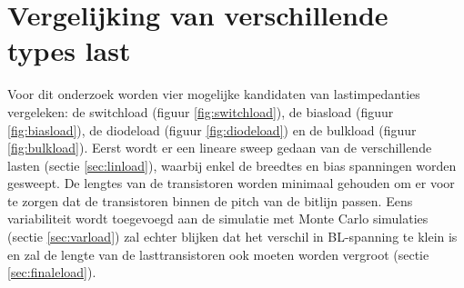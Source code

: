 \section{Vergelijking van verschillende types last}
Voor dit onderzoek worden vier mogelijke kandidaten van lastimpedanties vergeleken: de switchload (figuur \ref{fig:switchload}), de biasload (figuur \ref{fig:biasload}), de diodeload (figuur \ref{fig:diodeload}) en de bulkload (figuur \ref{fig:bulkload})\cite{bulkload}. Eerst wordt er een lineare sweep gedaan van de verschillende lasten (sectie \ref{sec:linload}), waarbij enkel de breedtes en bias spanningen worden gesweept. De lengtes van de transistoren worden minimaal gehouden om er voor te zorgen dat de transistoren binnen de pitch van de bitlijn passen. Eens variabiliteit wordt toegevoegd aan de simulatie met Monte Carlo simulaties (sectie \ref{sec:varload}) zal echter blijken dat het verschil in BL-spanning te klein is en zal de lengte van de lasttransistoren ook moeten worden vergroot (sectie \ref{sec:finaleload}).

